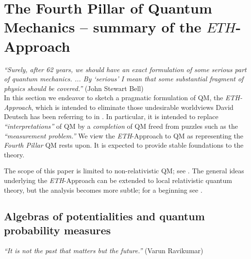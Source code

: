 \documentclass[12pt]{article}
\begin{document}
\section{The Fourth Pillar of Quantum Mechanics -- summary of the $\mathbf{\textit{ETH}}$-Approach}\label{ETH}

\hspace{0.5cm}\textit{``Surely, after 62 years, we should have an exact formulation of some serious part of quantum mechanics. ... By `serious' I mean that some substantial fragment of physics should be covered.''} (John Stewart Bell)\\

In this section we endeavor to sketch a pragmatic formulation of QM, the \textit{ETH-Approach}, which is intended to 
eliminate those undesirable worldviews David Deutsch has been referring to in \cite{Deutsch}. In particular, it is intended
 to replace \textit{``interpretations''} of QM by a \textit{completion} of QM freed from puzzles such as the 
 \textit{``measurement problem.''} We view the \textit{ETH}-Approach to QM as representing the \textit{Fourth Pillar} QM rests 
 upon. It is expected to provide stable foundations to the theory.
 
 The scope of this paper is limited to non-relativistic QM; see  
 \cite{BFS, Fr1}. The general ideas underlying the \textit{ETH}-Approach can be extended to local relativistic 
 quantum theory, but the analysis becomes more subtle; for a beginning see \cite{Fr2}.
 
  \subsection{Algebras of potentialities and quantum probability measures}
 
 \hspace{0.5cm}\textit{``It is not the past that matters but the future.''} (Varun Ravikumar)
 
\end{document}
